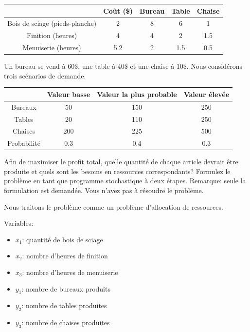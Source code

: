 \documentclass[12pt]{book}
\begin{document}
\begin{enumerate}
\begin{tabular}{|c|c|c|c|c|}
	\hline
	& Coût (\$) & Bureau & Table & Chaise \\
	\hline
	Bois de sciage (pieds-planche) & 2 & 8 & 6 & 1 \\
	\hline
	Finition (heures) & 4 & 4 & 2 & 1.5 \\
	\hline
	Menuiserie (heures) & 5.2 & 2 & 1.5 & 0.5 \\
	\hline
\end{tabular}

Un bureau se vend à 60\$, une table à 40\$ et une chaise à 10\$.
Nous considérons trois scénarios de demande.

\begin{tabular}{|c|c|c|c|}
	\hline
	& Valeur basse & Valeur la plus probable & Valeur élevée \\
	\hline
	Bureaux & 50 & 150 & 250 \\
	\hline
	Tables & 20 & 110 & 250 \\
	\hline
	Chaises & 200 & 225 & 500 \\
	\hline
	Probabilité & 0.3 & 0.4 & 0.3 \\
	\hline
\end{tabular}

Afin de maximiser le profit total, quelle quantité de chaque article devrait être produite et quels sont les besoins en ressources correspondants?
Formulez le problème en tant que programme stochastique à deux étapes.
Remarque: seule la formulation est demandée. Vous n'avez pas à résoudre le problème.

Nous traitons le problème comme un problème d'allocation de ressources.

Variables:
\begin{itemize}
	\item $x_1$: quantité de bois de sciage
	\item $x_2$: nombre d'heures de finition
	\item $x_3$: nombre d'heures de menuiserie
	\item $y_1$: nombre de bureaux produits
	\item $y_2$: nombre de tables produites
	\item $y_3$: nombre de chaises produites
\end{itemize}


\end{enumerate}
\end{document}
